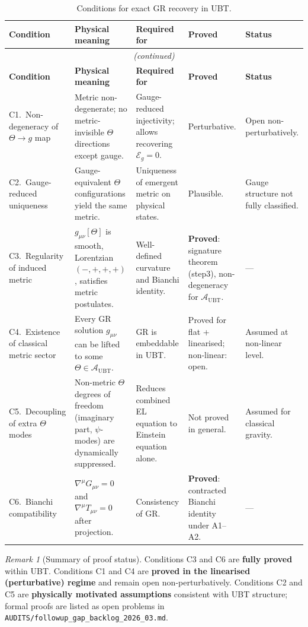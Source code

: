 \documentclass[12pt]{article}
\theoremstyle{definition}
\theoremstyle{remark}
\newtheorem{remark}[theorem]{Remark}
\begin{document}
\begin{longtable}{@{}p{3.2cm}p{3.4cm}p{3.5cm}p{1.8cm}p{2.0cm}@{}}
\caption{Conditions for exact GR recovery in UBT.\label{tab:conditions}}\\
\toprule
\textbf{Condition} &
\textbf{Physical meaning} &
\textbf{Required for} &
\textbf{Proved} &
\textbf{Status}
\\
\midrule
\endfirsthead
\multicolumn{5}{c}{\textit{(continued)}}\\
\toprule
\textbf{Condition} &
\textbf{Physical meaning} &
\textbf{Required for} &
\textbf{Proved} &
\textbf{Status}
\\
\midrule
\endhead
%
C1.\ Non-degeneracy of $\Theta \to g$ map
& Metric non-degenerate; no metric-invisible $\Theta$ directions except gauge.
& Gauge-reduced injectivity; allows recovering $\mathcal{E}_g = 0$.
& Perturbative.
& Open non-perturbatively.
\\[4pt]
%
C2.\ Gauge-reduced uniqueness
& Gauge-equivalent $\Theta$ configurations yield the same metric.
& Uniqueness of emergent metric on physical states.
& Plausible.
& Gauge structure not fully classified.
\\[4pt]
%
C3.\ Regularity of induced metric
& $g_{\mu\nu}[\Theta]$ is smooth, Lorentzian $(-,+,+,+)$, satisfies metric postulates.
& Well-defined curvature and Bianchi identity.
& \textbf{Proved}: signature theorem (step3), non-degeneracy for $\mathcal{A}_{\mathrm{UBT}}$.
& —
\\[4pt]
%
C4.\ Existence of classical metric sector
& Every GR solution $g_{\mu\nu}$ can be lifted to some $\Theta \in \mathcal{A}_{\mathrm{UBT}}$.
& GR is embeddable in UBT.
& Proved for flat + linearised; non-linear: open.
& Assumed at non-linear level.
\\[4pt]
%
C5.\ Decoupling of extra $\Theta$ modes
& Non-metric $\Theta$ degrees of freedom (imaginary part, $\psi$-modes) are dynamically suppressed.
& Reduces combined EL equation to Einstein equation alone.
& Not proved in general.
& Assumed for classical gravity.
\\[4pt]
%
C6.\ Bianchi compatibility
& $\nabla^\mu G_{\mu\nu} = 0$ and $\nabla^\mu T_{\mu\nu} = 0$ after projection.
& Consistency of GR.
& \textbf{Proved}: contracted Bianchi identity under A1--A2.
& —
\\
\bottomrule
\end{longtable}

\begin{remark}[Summary of proof status]
Conditions C3 and C6 are \textbf{fully proved} within UBT.
Conditions C1 and C4 are \textbf{proved in the linearised (perturbative) regime}
and remain open non-perturbatively.
Conditions C2 and C5 are \textbf{physically motivated assumptions} consistent
with UBT structure; formal proofs are listed as open problems in
\texttt{AUDITS/followup\_gap\_backlog\_2026\_03.md}.
\end{remark}
\end{document}

